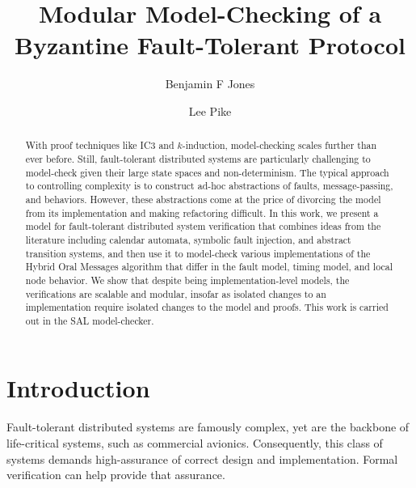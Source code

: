 \documentclass{llncs/llncs}
\begin{document}
\title{Modular Model-Checking of a Byzantine Fault-Tolerant Protocol}

\author{Benjamin F Jones \and Lee Pike}


\maketitle

\begin{abstract}
With proof techniques like IC3 and $k$-induction, model-checking scales further
than ever before. Still, fault-tolerant distributed systems are particularly
challenging to model-check given their large state spaces and
non-determinism. The typical approach to controlling complexity is to construct
ad-hoc abstractions of faults, message-passing, and behaviors. However, these
abstractions come at the price of divorcing the model from its implementation
and making refactoring difficult. In this work, we present a model for
fault-tolerant distributed system verification that combines ideas from the
literature including calendar automata, symbolic fault injection, and abstract
transition systems, and then use it to model-check various implementations of
the Hybrid Oral Messages algorithm that differ in the fault model, timing model,
and local node behavior. We show that despite being implementation-level models,
the verifications are scalable and modular, insofar as isolated changes to an
implementation require isolated changes to the model and proofs. This work is
carried out in the SAL model-checker.
\end{abstract}

\section{Introduction}

Fault-tolerant distributed systems are famously complex, yet are the backbone of life-critical systems, such as commercial avionics. Consequently, this class of systems demands high-assurance of correct design and implementation. Formal verification can help provide that assurance.
\end{document}
